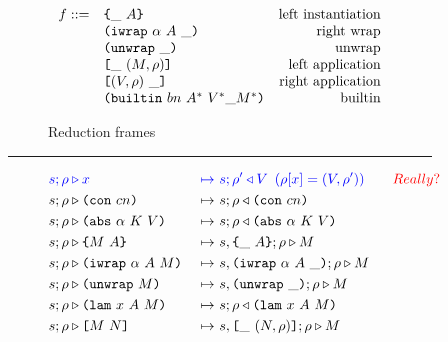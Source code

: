 \documentclass[../plutus-core-specification.tex]{subfiles}
\begin{document}
\begin{figure}[!ht]
\begin{subfigure}[c]{\linewidth}  %
{
\[
    \begin{array}{rlr}
       f ::= & \texttt{\{}\_ ~ A\texttt{\}}                     & \textrm{left instantiation}\\
             & \texttt{(} \texttt{iwrap} ~ \alpha ~ A ~ \_ \texttt{)}            & \textrm{right wrap}\\
             & \texttt{(} \texttt{unwrap} ~ \_ \texttt{)}{}                        & \textrm{unwrap}\\
             & \texttt{[} \_ ~ (M,\rho) \texttt{]}                 & \textrm{left application}\\
             & \texttt{[} (V,\rho) ~ \_ \texttt{]}                & \textrm{right application}\\
             & \texttt{(} \texttt{builtin} ~ bn ~ A^* ~ V^* \_ M^* \texttt{)}        & \textrm{builtin}\\
    \end{array}
\]
}
\caption{Reduction frames}
\end{subfigure}
\vspace{1mm}
\hrule
\vspace{2mm}
\begin{subfigure}[c]{\linewidth}  %
{
    \begin{alignat*}{2}
      \blue{s; \rho} & \bcompute \blue{x}          &~\bmapsto~&\blue{s;\rho^{\prime} \return V \enspace (\rho[x] = (V,\rho^{\prime}))} \qquad{\red{Really?}}\\  %
       s; \rho &\compute \con{cn}                 &~\mapsto~& s;\rho \return \con{cn}\\
       s; \rho &\compute \abs{\alpha}{K}{V}       &~\mapsto~& s;\rho \return \abs{\alpha}{K}{V}\\
       s; \rho &\compute \inst{M}{A}              &~\mapsto~& s,\inInstLeftFrame{A};\rho \compute M\\
       s; \rho &\compute \wrap{\alpha}{A}{M}      &~\mapsto~& s,\inWrapRightFrame{\alpha}{A};\rho  \compute M\\ 
       s; \rho &\compute \unwrap{M}               &~\mapsto~& s,\inUnwrapFrame{};\rho  \compute M\\
       s; \rho &\compute \lam{x}{A}{M}            &~\mapsto~& s;\rho \return \lam{x}{A}{M}\\
       s; \rho &\compute \app{M}{N}               &~\mapsto~& s,\inAppLeftFrame{(N,\rho)};\rho \compute M\\

\end{alignat*}}
\end{subfigure}
\end{figure}
\end{document}
